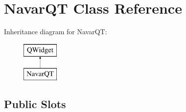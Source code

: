 \hypertarget{class_navar_q_t}{}\section{Navar\+QT Class Reference}
\label{class_navar_q_t}
Inheritance diagram for Navar\+QT\+:\begin{figure}[H]
\begin{center}
\leavevmode
\includegraphics[height=2.000000cm]{class_navar_q_t}
\end{center}
\end{figure}
\subsection*{Public Slots}

